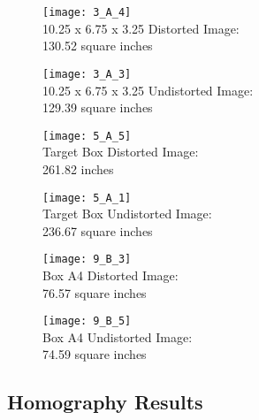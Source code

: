 \documentclass[11pt, twoside, reqno]{book}
\begin{document}
 \begin{figure}
	\centering
	\begin{minipage}{.5\textwidth}
		\centering
		\texttt{[image: 3\_A\_4]}
		\\10.25 x 6.75 x 3.25 Distorted Image: \\130.52 square inches
	\end{minipage}%
	\begin{minipage}{.5\textwidth}
		\centering
		\texttt{[image: 3\_A\_3]}
		\\10.25 x 6.75 x 3.25 Undistorted Image:\\  129.39 square inches 	
	\end{minipage}
\end{figure}

 
 \begin{figure}
	\centering
	\begin{minipage}{.5\textwidth}
		\centering
		\texttt{[image: 5\_A\_5]}
		\\Target Box Distorted Image: \\261.82 inches 	
	\end{minipage}%
	\begin{minipage}{.5\textwidth}
		\centering
		\texttt{[image: 5\_A\_1]}
		\\Target Box Undistorted Image:\\ 236.67 square inches
	\end{minipage}
\end{figure}



 \begin{figure}
	\centering
	\begin{minipage}{.5\textwidth}
		\centering
		\texttt{[image: 9\_B\_3]}
		\\Box A4 Distorted Image: \\76.57 square inches 	
	\end{minipage}%
	\begin{minipage}{.5\textwidth}
		\centering
		\texttt{[image: 9\_B\_5]}
		\\Box A4 Undistorted Image:\\ 74.59 square inches
	\end{minipage}
\end{figure}
\FloatBarrier

\subsection{Homography Results}
\end{document}
